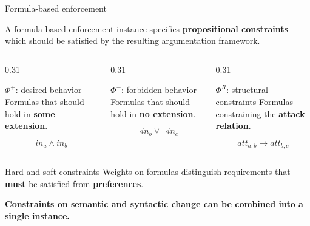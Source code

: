 \documentclass[aspectratio=169]{beamer}
\begin{document}
\begin{frame}{Formula-based enforcement}

\begin{center}
  A formula-based enforcement instance specifies \textbf{propositional constraints}
  which should be satisfied by the resulting argumentation framework.
\end{center}

\vspace{0.4em}

\begin{columns}[T,onlytextwidth]

  \begin{column}{0.31\textwidth}
    \begin{block}{$\Phi^{+}$: desired behavior}
      Formulas that should hold in
      \textbf{some extension}.

      \vspace{0.4em}

      \[
        in_{a} \land in_{b}
      \]
    \end{block}
  \end{column}

  \begin{column}{0.31\textwidth}
    \begin{block}{$\Phi^{-}$: forbidden behavior}
      Formulas that should hold in
      \textbf{no extension}.

      \vspace{0.4em}

      \[
        \neg in_{b} \lor \neg in_{c}
      \]
    \end{block}
  \end{column}

  \begin{column}{0.31\textwidth}
    \begin{block}{$\Phi^{R}$: structural constraints}
      Formulas constraining the
      \textbf{attack relation}.

      \vspace{0.4em}

      \[
        att_{a,b} \rightarrow att_{b,c}
      \]
    \end{block}
  \end{column}

\end{columns}

\vspace{0.7em}

\begin{block}{Hard and soft constraints}
Weights on formulas distinguish requirements that \textbf{must} be satisfied from
\textbf{preferences}.
\end{block}

\begin{center}
  \textbf{Constraints on semantic and syntactic change can be combined into a single instance.}
\end{center}

\end{frame}
\end{document}
